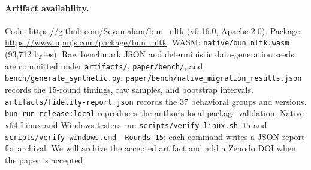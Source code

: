 \documentclass[pdflatex,sn-mathphys-num]{sn-jnl}
\theoremstyle{thmstyleone}
\begin{document}
\paragraph{Artifact availability.}
Code: \url{https://github.com/Seyamalam/bun_nltk} (v0.16.0, Apache-2.0). Package: \url{https://www.npmjs.com/package/bun_nltk}. WASM: \texttt{native/bun\_nltk.wasm} (93{,}712 bytes). Raw benchmark JSON and deterministic data-generation seeds are committed under \texttt{artifacts/}, \texttt{paper/bench/}, and \texttt{bench/generate\_synthetic.py}. \texttt{paper/bench/native\_migration\_results.json} records the 15-round timings, raw samples, and bootstrap intervals. \texttt{artifacts/fidelity-report.json} records the 37 behavioral groups and versions. \texttt{bun run release:local} reproduces the author's local package validation. Native x64 Linux and Windows testers run \texttt{scripts/verify-linux.sh 15} and \texttt{scripts/verify-windows.cmd -Rounds 15}; each command writes a JSON report for archival. We will archive the accepted artifact and add a Zenodo DOI when the paper is accepted.


\end{document}
